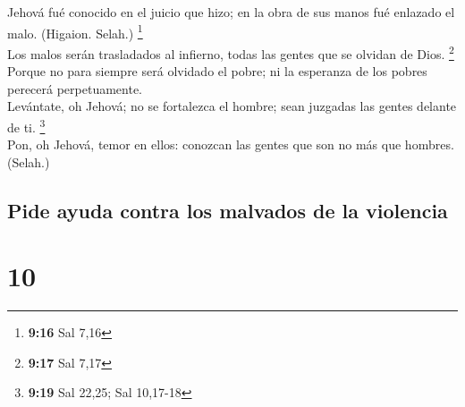  Jehová fué conocido en el juicio que hizo; en la obra de
sus manos fué enlazado el malo. (Higaion. Selah.) \footnote{\textbf{9:16}
  Sal 7,16}\\
 Los malos serán trasladados al infierno, todas las
gentes que se olvidan de Dios. \footnote{\textbf{9:17} Sal 7,17}\\
 Porque no para siempre será olvidado el pobre; ni la
esperanza de los pobres perecerá perpetuamente.\\
 Levántate, oh Jehová; no se fortalezca el hombre; sean
juzgadas las gentes delante de ti. \footnote{\textbf{9:19} Sal 22,25;
  Sal 10,17-18}\\
 Pon, oh Jehová, temor en ellos: conozcan las gentes que
son no más que hombres. (Selah.)

\hypertarget{pide-ayuda-contra-los-malvados-de-la-violencia}{%
\subsection{Pide ayuda contra los malvados de la
violencia}\label{pide-ayuda-contra-los-malvados-de-la-violencia}}

\hypertarget{section-9}{%
\section{10}\label{section-9}}

